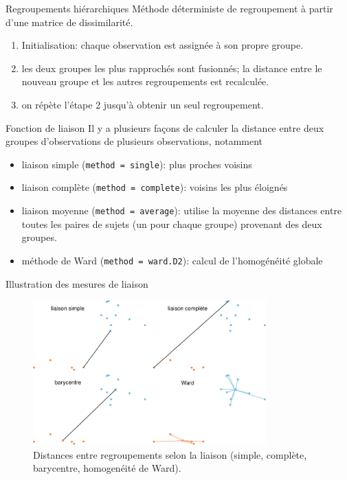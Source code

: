 \documentclass[
  ignorenonframetext,
]{beamer}
\providecommand{\tightlist}{%
  \setlength{\itemsep}{0pt}\setlength{\parskip}{0pt}}\usepackage{longtable,booktabs,array}
\begin{document}
\begin{frame}{Regroupements hiérarchiques}
\protect\hypertarget{regroupements-hiuxe9rarchiques}{}
Méthode déterministe de regroupement à partir d'une matrice de
dissimilarité.

\begin{enumerate}
\tightlist
\item
  Initialisation: chaque observation est assignée à son propre groupe.
\item
  les deux groupes les plus rapprochés sont fusionnés; la distance entre
  le nouveau groupe et les autres regroupements est recalculée.
\item
  on répète l'étape 2 jusqu'à obtenir un seul regroupement.
\end{enumerate}
\end{frame}

\begin{frame}[fragile]{Fonction de liaison}
\protect\hypertarget{fonction-de-liaison}{}
Il y a plusieurs façons de calculer la distance entre deux groupes
d'observations de plusieurs observations, notamment

\begin{itemize}
\tightlist
\item
  liaison simple (\texttt{method\ =\ single}): plus proches voisins
\item
  liaison complète (\texttt{method\ =\ complete}): voisins les plus
  éloignés
\item
  liaison moyenne (\texttt{method\ =\ average}): utilise la moyenne des
  distances entre toutes les paires de sujets (un pour chaque groupe)
  provenant des deux groupes.
\item
  méthode de Ward (\texttt{method\ =\ ward.D2}): calcul de l'homogénéité
  globale
\end{itemize}
\end{frame}

\begin{frame}{Illustration des mesures de liaison}
\protect\hypertarget{illustration-des-mesures-de-liaison}{}
\begin{figure}

{\centering \includegraphics[width=0.8\textwidth,height=\textheight]{MATH60602-diapos12_files/figure-beamer/fig-distances-1.pdf}

}

\caption{\label{fig-distances}Distances entre regroupements selon la
liaison (simple, complète, barycentre, homogenéité de Ward).}

\end{figure}
\end{frame}
\end{document}
